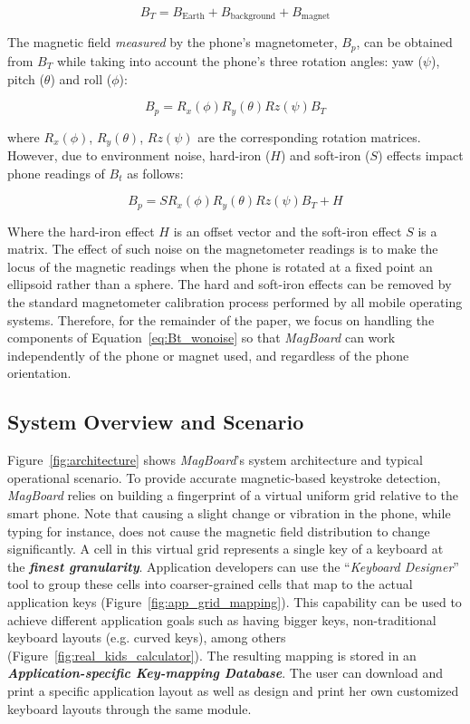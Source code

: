 \documentclass[conference]{IEEEtran}
\def \sys {\textit{MagBoard}}
\begin{document}
\begin{equation}
B_T = B_{\textrm{Earth}} + B_{\textrm{background}} + B_{\textrm{magnet}} 
\end{equation}

The magnetic field \emph{measured} by the phone's magnetometer, $B_p$, can be obtained from $B_T$ while taking into account the phone's three rotation angles: yaw ($\psi$), pitch ($\theta$) and roll ($\phi$):

\begin{equation}
B_p = R_x(\phi)R_y(\theta)Rz(\psi) B_T
\label{eq:Bt_wonoise}
\end{equation}

where  $R_x(\phi)$, $R_y(\theta)$, $Rz(\psi)$ are the corresponding rotation matrices. However, due to environment noise, hard-iron ($H$) and soft-iron ($S$) effects impact phone readings of $B_t$ \cite{ozyagcilar2012calibrating} as follows: 

\begin{equation}
B_p = S R_x(\phi)R_y(\theta)Rz(\psi) B_T + H
\end{equation}

Where the hard-iron effect $H$ is an offset vector and the soft-iron effect $S$ is a matrix. The effect of such noise on the magnetometer readings is to make the locus of the magnetic readings when the phone is rotated at a fixed point an ellipsoid rather than a sphere. The hard and soft-iron effects can be removed by the standard magnetometer calibration process performed by all mobile operating systems. Therefore, for the remainder of the paper, we focus on handling the components of Equation~\ref{eq:Bt_wonoise} so that \sys{} can work independently of the phone or magnet used, and regardless of the phone orientation.

\subsection{System Overview and Scenario}

Figure~\ref{fig:architecture} shows \sys{}'s system architecture and typical operational scenario. To provide accurate magnetic-based keystroke detection, \sys{} relies on building a fingerprint of a virtual uniform grid relative to the smart phone. Note that causing a slight change or vibration in the phone, while typing for instance, does not cause the magnetic field distribution to change significantly. A cell in this virtual grid represents a single key of a keyboard at the \textbf{\emph{finest granularity}}. Application developers can use the ``\emph{Keyboard Designer}'' tool to group these cells into coarser-grained cells that map to the actual application keys (Figure~\ref{fig:app_grid_mapping}). This capability can be used to achieve different application goals such as having bigger keys, non-traditional keyboard layouts (e.g. curved keys), among others (Figure~\ref{fig:real_kids_calculator}). The resulting mapping is stored in an \textbf{\emph{Application-specific Key-mapping Database}}. The user can download and print a specific application layout as well as design and print her own customized keyboard layouts through the same module.
\end{document}
